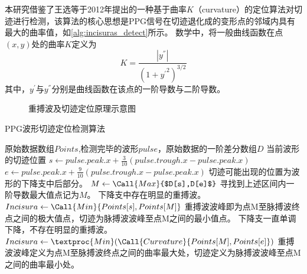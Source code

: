 本研究借鉴了王选等\cite{Wang2012}于2012年提出的一种基于曲率$K$（curvature）的定位算法对切迹进行检测，该算法的核心思想是PPG信号在切迹退化成的变形点的邻域内具有最大的曲率值，如\autoref{alg:incisuras_detect}所示。
数学中，将一般曲线函数在点$(x,y)$处的曲率$K$定义为
\begin{equation}
    \label{equ:curvature}
    K=\frac{|y^{''}|}{{(1+{y^{'}}^2)}^{3/2}}
\end{equation}
其中，$y^{'}$与$y^{''}$分别是曲线函数在该点的一阶导数与二阶导数。

\begin{figure}[htbp]
    \centering
    \quad
    \caption[重搏波及切迹定位原理示意图]{\label{fig:incisura}重搏波及切迹定位原理示意图\cite{Wang2012,Su2014}}
\end{figure}

\begin{breakablealgorithm}
    \caption{PPG波形切迹定位检测算法}
    \label{alg:incisuras_detect}
    \begin{algorithmic}[1] %
        \Require 原始数据数组$Points$,检测完毕的波形$pulse$，原始数据的一阶差分数组$D$
        \Ensure 当前波形的切迹位置
            \State $s \gets pulse.peak.x + \frac{3}{10}(pulse.trough.x-pulse.peak.x)$
            \State $e \gets pulse.peak.x + \frac{9}{10}(pulse.trough.x-pulse.peak.x)$
            \State \Comment 切迹可能出现的位置为波形的下降支中后部分。
            \State $M  \gets \Call{Max}{$D[s],D[e]$}$
            \State \Comment 寻找到上述区间内一阶导数最大值点记为$M$。
                \State \Comment 下降支中存在明显的重搏波。
                \State $Incisura \gets \Call{Min}{Points[s],Points[M]}$
                \State \Comment 重搏波波峰即为点M至脉搏波终点之间的极大值点，切迹为脉搏波波峰至点M之间的最小值点。
            \Else
                \State \Comment 下降支一直单调下降，不存在明显的重搏波。
                \State $Incisura \gets \textproc{Min}({\Call{Curvature}{Points[M],Points[e]}})$
                \State \Comment 重搏波波峰定义为点M至脉搏波终点之间的曲率最大处，切迹定义为脉搏波波峰至点M之间的曲率最小处。
            \EndIf
            \State {}
        \EndFunction
    \end{algorithmic}
\end{breakablealgorithm}

